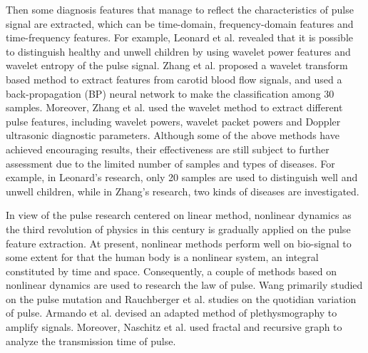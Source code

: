 Then some diagnosis features that manage to reflect the
characteristics of pulse signal are extracted, which can be
time-domain, frequency-domain features and time-frequency
features.\cite{zhang2005study,leonard2004wavelet,zhang2002wavelet, lu1999pulse,zhang2008wavelet,chen2011computerized}
 For example, Leonard et al.\cite{leonard2004wavelet} revealed that it is possible to
distinguish healthy and unwell children by using wavelet power
features and wavelet entropy of the pulse signal. Zhang et al.\cite{zhang2002wavelet}
proposed a wavelet transform based method to extract features from
carotid blood flow signals, and used a back-propagation (BP) neural
network to make the classification among 30 samples. Moreover, Zhang
et al.\cite{zhang2008wavelet} used the wavelet method to extract different pulse
features, including wavelet powers, wavelet packet powers and Doppler
ultrasonic diagnostic parameters. Although some of the above methods
have achieved encouraging results, their effectiveness are still
subject to further assessment due to the limited number of samples and
types of diseases. For example, in Leonard’s research,\cite{leonard2004wavelet} only 20
samples are used to distinguish well and unwell children, while in
Zhang’s research,\cite{zhang2008wavelet} two kinds of diseases are investigated. 

In view of the pulse research centered on linear method, nonlinear
dynamics as the third revolution of physics in this century is
gradually applied on the pulse feature extraction. At present,
nonlinear methods perform well on bio-signal to some extent for that
the human body is a nonlinear system, an integral constituted by time
and space. Consequently, a couple of methods based on nonlinear
dynamics are used to research the law of
pulse.\cite{li1999study,rauchberger1998analysis,barreto1997adaptive,naschitz2003assessment}
Wang primarily studied on the pulse mutation\cite{li1999study} and Rauchberger et al. studies on
the quotidian variation of pulse.\cite{rauchberger1998analysis} Armando et al. devised an
adapted method of plethysmography to amplify signals.\cite{barreto1997adaptive} Moreover,
Naschitz et al. used fractal and recursive graph to analyze the
transmission time of pulse.\cite{naschitz2003assessment}

